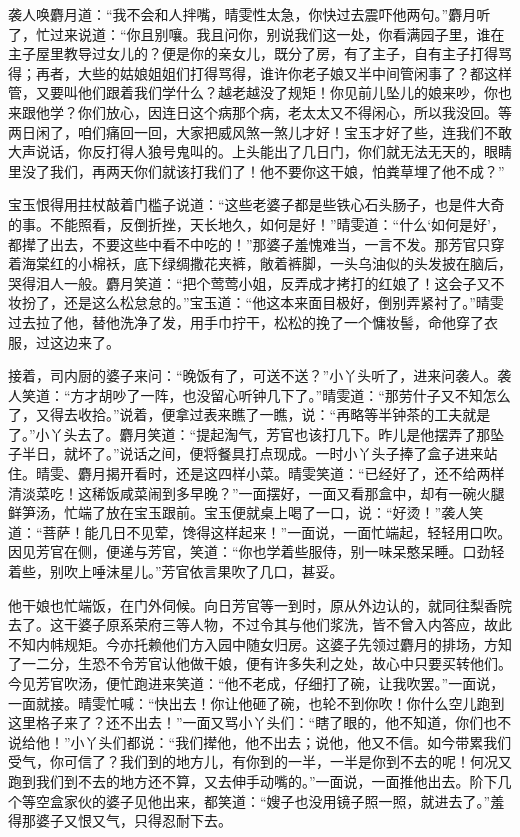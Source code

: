 \documentclass[12pt,oneside]{book}
\begin{document}
袭人唤麝月道：“我不会和人拌嘴，晴雯性太急，你快过去震吓他两句。”麝月听了，忙过来说道：“你且别嚷。我且问你，别说我们这一处，你看满园子里，谁在主子屋里教导过女儿的？便是你的亲女儿，既分了房，有了主子，自有主子打得骂得；再者，大些的姑娘姐姐们打得骂得，谁许你老子娘又半中间管闲事了？都这样管，又要叫他们跟着我们学什么？越老越没了规矩！你见前儿坠儿的娘来吵，你也来跟他学？你们放心，因连日这个病那个病，老太太又不得闲心，所以我没回。等两日闲了，咱们痛回一回，大家把威风煞一煞儿才好！宝玉才好了些，连我们不敢大声说话，你反打得人狼号鬼叫的。上头能出了几日门，你们就无法无天的，眼睛里没了我们，再两天你们就该打我们了！他不要你这干娘，怕粪草埋了他不成？”

宝玉恨得用拄杖敲着门槛子说道：“这些老婆子都是些铁心石头肠子，也是件大奇的事。不能照看，反倒折挫，天长地久，如何是好！”晴雯道：“什么‘如何是好’，都撵了出去，不要这些中看不中吃的！”那婆子羞愧难当，一言不发。那芳官只穿着海棠红的小棉袄，底下绿绸撒花夹裤，敞着裤脚，一头乌油似的头发披在脑后，哭得泪人一般。麝月笑道：“把个莺莺小姐，反弄成才拷打的红娘了！这会子又不妆扮了，还是这么松怠怠的。”宝玉道：“他这本来面目极好，倒别弄紧衬了。”晴雯过去拉了他，替他洗净了发，用手巾拧干，松松的挽了一个慵妆髻，命他穿了衣服，过这边来了。

接着，司内厨的婆子来问：“晚饭有了，可送不送？”小丫头听了，进来问袭人。袭人笑道：“方才胡吵了一阵，也没留心听钟几下了。”晴雯道：“那劳什子又不知怎么了，又得去收拾。”说着，便拿过表来瞧了一瞧，说：“再略等半钟茶的工夫就是了。”小丫头去了。麝月笑道：“提起淘气，芳官也该打几下。昨儿是他摆弄了那坠子半日，就坏了。”说话之间，便将餐具打点现成。一时小丫头子捧了盒子进来站住。晴雯、麝月揭开看时，还是这四样小菜。晴雯笑道：“已经好了，还不给两样清淡菜吃！这稀饭咸菜闹到多早晚？”一面摆好，一面又看那盒中，却有一碗火腿鲜笋汤，忙端了放在宝玉跟前。宝玉便就桌上喝了一口，说：“好烫！”袭人笑道：“菩萨！能几日不见荤，馋得这样起来！”一面说，一面忙端起，轻轻用口吹。因见芳官在侧，便递与芳官，笑道：“你也学着些服侍，别一味呆憨呆睡。口劲轻着些，别吹上唾沫星儿。”芳官依言果吹了几口，甚妥。

他干娘也忙端饭，在门外伺候。向日芳官等一到时，原从外边认的，就同往梨香院去了。这干婆子原系荣府三等人物，不过令其与他们浆洗，皆不曾入内答应，故此不知内帏规矩。今亦托赖他们方入园中随女归房。这婆子先领过麝月的排场，方知了一二分，生恐不令芳官认他做干娘，便有许多失利之处，故心中只要买转他们。今见芳官吹汤，便忙跑进来笑道：“他不老成，仔细打了碗，让我吹罢。”一面说，一面就接。晴雯忙喊：“快出去！你让他砸了碗，也轮不到你吹！你什么空儿跑到这里格子来了？还不出去！”一面又骂小丫头们：“瞎了眼的，他不知道，你们也不说给他！”小丫头们都说：“我们撵他，他不出去；说他，他又不信。如今带累我们受气，你可信了？我们到的地方儿，有你到的一半，一半是你到不去的呢！何况又跑到我们到不去的地方还不算，又去伸手动嘴的。”一面说，一面推他出去。阶下几个等空盒家伙的婆子见他出来，都笑道：“嫂子也没用镜子照一照，就进去了。”羞得那婆子又恨又气，只得忍耐下去。
\end{document}
